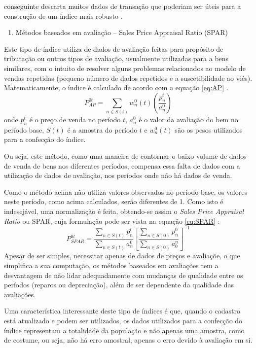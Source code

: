 \documentclass[
	12pt,				%
	oneside,			%
	a4paper,			%
	chapter=TITLE,		%
	section=TITLE,		%
	english,			%
	brazil				%
	]{abntex2}
\begin{document}
conseguinte descarta muitos dados de transação que poderiam ser úteis
para a construção de um índice mais robusto \autocite[160]{rppi}.
\begin{enumerate}
\def\labelenumi{\alph{enumi}.}
\setcounter{enumi}{3}
\tightlist
\item
  Métodos baseados em avaliação -- Sales Price Appraisal Ratio (SPAR)
\end{enumerate}
Este tipo de índice utiliza de dados de avaliação feitas para propósito
de tributação ou outros tipos de avaliação, usualmente utilizadas para a
bens similares, com o intuito de resolver alguns problemas relacionados
ao modelo de vendas repetidas (pequeno número de dados repetidos e a
suscetibilidade ao viés). Matematicamente, o índice é calculado de
acordo com a equação \eqref{eq:AP} \autocite[75]{rppi}.
\begin{equation}
P_{AP}^{0t} = \sum_{n \in S(t)} w_n^0(t) \left ( \frac{p_n^t}{a_n^0} \right )
\label{eq:AP}
\end{equation}
onde \(p_n^t\) é o preço de venda no período \(t\), \(a_n^0\) é o valor
da avaliação do bem no período base, \(S(t)\) é a amostra do período
\(t\) e \(w_n^0(t)\) são os pesos utilizados para a confecção do índice.

Ou seja, este método, como uma maneira de contornar o baixo volume de
dados de venda de bens nos diferentes períodos, compensa essa falta de
dados com a utilização de dados de avaliação, nos períodos onde não há
dados de venda.

Como o método acima não utiliza valores observados no período base, os
valores neste período, como acima calculados, serão diferentes de 1.
Como isto é indesejável, uma normalização é feita, obtendo-se assim o
\emph{Sales Price Appraisal Ratio} ou SPAR, cuja formulação pode ser
vista na equação \eqref{eq:SPAR} \autocite[75]{rppi}:
\begin{equation}
P_{SPAR}^{0t} = \frac{\sum\limits_{n \in S(t)} p_n^t}{\sum\limits_{n \in S(t)} a_n^0} \left [ \frac{\sum\limits_{n \in S(0)} p_n^0}{\sum\limits_{n \in S(0)} a_0^n} \right ]^{-1}
\label{eq:SPAR}
\end{equation}
Apesar de ser simples, necessitar apenas de dados de preços e avaliaçõe,
o que simplifica a sua computação, os métodos baseados em avaliações tem
a desvantagem de não lidar adequadamente com mudanças de qualidade entre
os períodos (reparos ou depreciação), além de ser dependente da
qualidade das avaliações.

Uma característica interessante deste tipo de índices é que, quando o
cadastro está atualizado e podem ser utilizados, os dados utilizados
para a confecção do índice representam a totalidade da população e não
apenas uma amostra, como de costume, ou seja, não há erro amostral,
apenas o erro devido à avaliação em si.
\end{document}
